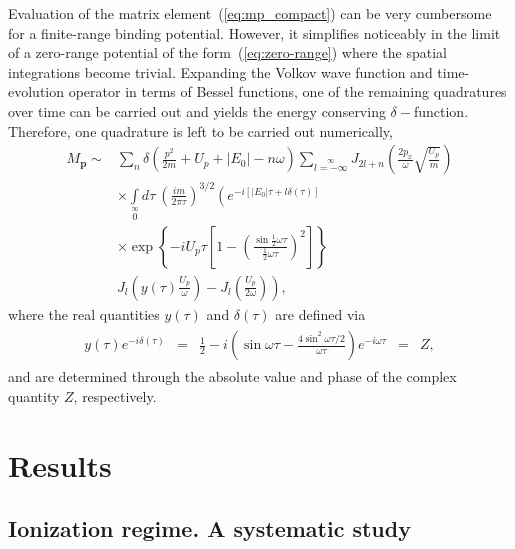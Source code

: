 Evaluation of the matrix element~(\ref{eq:mp_compact}) can be very
cumbersome for a finite-range binding potential. However, it
simplifies noticeably in the limit of a zero-range potential of the
form~(\ref{eq:zero-range}) where the spatial integrations become
trivial. Expanding the Volkov wave function and time-evolution
operator in terms of Bessel functions, one of the remaining
quadratures over time can be carried out and yields the energy
conserving $\delta-$function. Therefore, one quadrature is left to be
carried out numerically,
%
\begin{equation}
\label{eq:Mp_quad}
\begin{split}
M_{\mathbf{p}} \sim &
\sum\limits_{n} \delta\left(\frac{p^{2}}{2m} + U_{p} + |E_{0}| - n\omega\right)
\sum\limits_{l=-\infty}\limits^{\infty}
J_{2l+n}\left( \frac{2p_{x}}{\omega} \sqrt{\frac{U_{p}}{m}} \right) \\
& \times \int\limits_{0}\limits^{\infty} d\tau\ \left( \frac{im}{2\pi\tau} \right)^{3/2}
\left( e^{-i[|E_{0}|\tau + l\delta(\tau)]} \right. \\
& \times \exp\left\{-iU_{p}\tau
\left[1 - \left(\frac{\sin\frac{1}{2}\omega\tau}{\frac{1}{2}\omega\tau}\right)^{2}\right]
\right\} \\
& \left. J_{l}\left(y(\tau)\frac{U_{p}}{\omega}\right)
- J_{l}\left(\frac{U_{p}}{2\omega}\right)
\right),
\end{split}
\end{equation}
%
where the real quantities $y(\tau)$ and $\delta(\tau)$ are defined via
%
\begin{eqnarray}
\label{eq:real_quant}
\begin{split}
y(\tau) e^{-i \delta(\tau)} & = & \frac{1}{2} - i \left(
\sin\omega\tau - \frac{4 \sin^{2}\omega\tau/2}{\omega\tau} \right)
e^{-i\omega\tau} & = & Z,
\end{split}
\end{eqnarray}
%
and are determined through the absolute value and phase of the complex
quantity $Z$, respectively.




\section{\label{sec:results_qm} Results}
\subsection{\label{sec:kopold_qm} Ionization regime. A systematic study}

